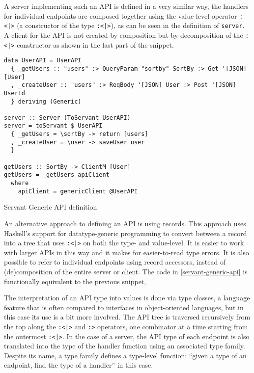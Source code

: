 \documentclass[english,odsaz]{fitthesis}
\begin{document}
A server implementing such an API is defined in a very similar way, the handlers
for individual endpoints are composed together using the value-level operator
\texttt{:<|>} (a constructor of the type \texttt{:<|>}), as can be seen in the definition of
\texttt{server}. A client for the API is not created by composition but by decomposition
of the \texttt{:<|>} constructor as shown in the last part of the snippet.

\begin{listing}[htbp]
\begin{verbatim}
data UserAPI = UserAPI
  { _getUsers :: "users" :> QueryParam "sortby" SortBy :> Get '[JSON] [User]
  , _createUser :: "users" :> ReqBody '[JSON] User :> Post '[JSON] UserId
  } deriving (Generic)

server :: Server (ToServant UserAPI)
server = toServant $ UserAPI
  { _getUsers = \sortBy -> return [users]
  , _createUser = \user -> saveUser user
  }

getUsers :: SortBy -> ClientM [User]
getUsers = _getUsers apiClient
  where
    apiClient = genericClient @UserAPI
\end{verbatim}
\caption{Servant Generic API definition \label{servant-generic-api}}
\end{listing}

An alternative approach to defining an API is using records. This approach uses
Haskell's support for datatype-generic programming to convert between a record
into a tree that uses \texttt{:<|>} on both the type- and value-level. It is easier to
work with larger APIs in this way and it makes for easier-to-read type
errors. It is also possible to refer to individual endpoints using record
accessors, instead of (de)composition of the entire server or client. The code
in \ref{servant-generic-api} is functionally equivalent to the previous snippet,

The interpretation of an API type into values is done via type classes, a
language feature that is often compared to interfaces in object-oriented
languages, but in this case its use is a bit more involved. The API tree is
traversed recursively from the top along the \texttt{:<|>} and \texttt{:>} operators, one
combinator at a time starting from the outermost \texttt{:<|>}. In the case of a server,
the API type of each endpoint is also translated into the type of the handler
function using an associated type family. Despite its name, a type family
defines a type-level function: ``given a type of an endpoint, find the type of a
handler'' in this case.
\end{document}

